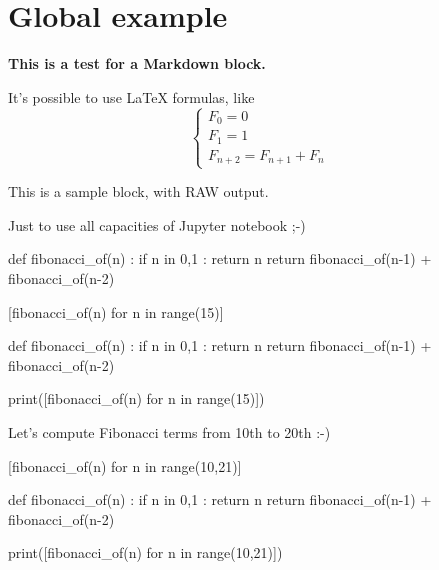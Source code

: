 \documentclass[a4paper,11pt]{article}
\begin{document}
\section{Global example}

\setcounter{JupyterIn}{0}

\begin{NotebookPitonMarkdown}{\linewidth}
{\Large\bfseries This is a test for a \textsf{Markdown} block.}

It's possible to use \LaTeX{} formulas, like %
\[
\left\lbrace\begin{array}{l}
F_0 = 0\\
F_1 = 1 \\
F_{n+2} = F_{n+1} + F_n
\end{array}\right.
\]
\end{NotebookPitonMarkdown}

\begin{NotebookPitonRaw}{\linewidth}
This is a sample block, with RAW output.

Just to use all capacities of Jupyter notebook ;-)
\end{NotebookPitonRaw}

\begin{NotebookPitonIn}{\linewidth}
def fibonacci_of(n) :
	if n in {0,1} :
		return n
	return fibonacci_of(n-1) + fibonacci_of(n-2)

[fibonacci_of(n) for n in range(15)]
\end{NotebookPitonIn}

\begin{NotebookPitonOut}{\linewidth}
def fibonacci_of(n) :
	if n in {0,1} :
		return n
	return fibonacci_of(n-1) + fibonacci_of(n-2)

print([fibonacci_of(n) for n in range(15)])
\end{NotebookPitonOut}

\begin{NotebookPitonRaw}{\linewidth}
Let’s compute Fibonacci terms from 10th to 20th :-)
\end{NotebookPitonRaw}

\begin{NotebookPitonIn}{\linewidth}
[fibonacci_of(n) for n in range(10,21)]
\end{NotebookPitonIn}

\begin{NotebookPitonConsole}{\linewidth}
def fibonacci_of(n) :
	if n in {0,1} :
		return n
	return fibonacci_of(n-1) + fibonacci_of(n-2)

print([fibonacci_of(n) for n in range(10,21)])
\end{NotebookPitonConsole}
\end{document}
